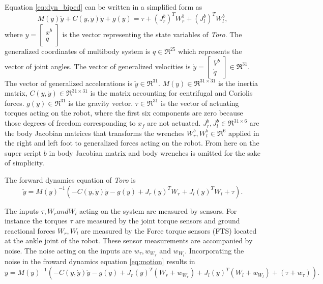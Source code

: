 Equation \ref{eq:dyn_biped} can be written in a simplified form as
\begin{equation} \label{eq:dyn_sbiped}
M(y)\ddot{y} + C(y,\dot{y})\dot{y} + g(y) = \tau + (J_r^b)^T W_r^b + (J_l^b)^T W_l^b,
\end{equation}
where $y = \begin{bmatrix} x^b \\ q \end{bmatrix}$ is the vector representing the state variables of \emph{Toro}. The generalized coordinates of multibody system is $q \in \Re^{25}$ which represents the vector of joint angles. The vector of generalized velocities is $\dot{y}=\begin{bmatrix} V^{b} \\ \dot{q} \end{bmatrix} \in \Re^{31}.$ The vector of generalized accelerations is $\ddot{y}\in \Re^{31}.$  $M(y)\in \Re^{31 \times 31}$ is the inertia matrix, $C(y,\dot{y})\in \Re^{31 \times 31}$ is the matrix accounting for centrifugal and Coriolis forces. $g(y) \in \Re^{31}$ is the gravity vector. $\tau \in \Re^{31}$ is the vector of actuating torques acting on the robot, where the first six components are zero because those degrees of freedom corresponding to $x_f$ are not actuated. $J_r^b,J_l^b \in \Re^{31 \times 6}$ are the body Jacobian matrices that transforms the wrenches $W_r^b,W_l^b \in \Re^{6}$ applied in the right and left foot to generalized forces acting on the robot. From here on the super script $b$ in body Jacobian matrix and body wrenches is omitted for the sake of simplicity.

The forward dynamics equation of \emph{Toro} is
\begin{equation}
	\label{eq:motion}
	\ddot{y} = M(y)^{-1}(-C(y,\dot{y})\dot{y} - g(y) + J_r(y)^{T}W_{r} +J_l(y)^{T}W_{l} + \tau). 
\end{equation}

The inputs $\tau, W_r and W_l$ acting on the system are measured by sensors. For instance the torques $\tau$ are measured by the joint torque sensors and ground reactional forces $W_r,W_l$ are measured by the Force torque sensors (FTS) located at the ankle joint of the robot. These sensor measurements are accompanied by noise. The noise acting on the inputs are $w_\tau,w_{W_r} \text{ and } w_{W_l}$. Incorporating the noise in the froward dynamics equation \ref{eq:motion} results in  
\begin{equation}
	\label{eq:motion_noise}
	\ddot{y} = M(y)^{-1}(-C(y,\dot{y})\dot{y} - g(y) + J_r(y)^{T}(W_{r}+w_{W_r}) +J_l(y)^{T}(W_{l} +w_{W_l})+ (\tau+ w_\tau )). 
\end{equation}


